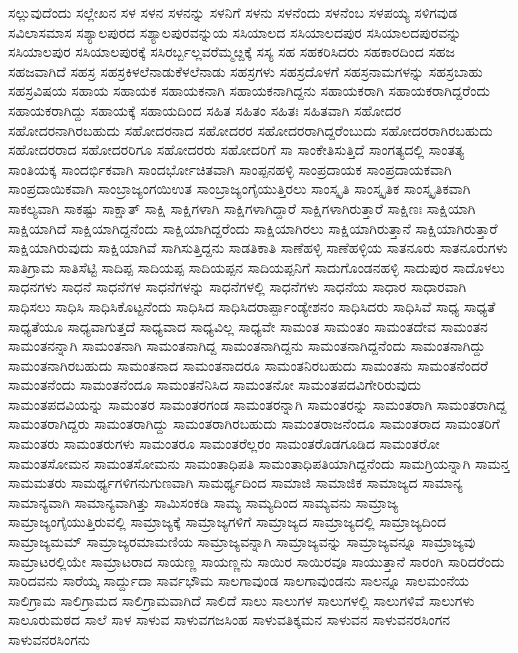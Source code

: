 {ಸಲ್ಲುವುದೆಂದು
ಸಲ್ಲೇಖನ
ಸಳ
ಸಳನ
ಸಳನನ್ನು
ಸಳನಿಗೆ
ಸಳನು
ಸಳನೆಂದು
ಸಳನೆಂಬ
ಸಳಪಯ್ಯ
ಸಳಿಗವುಡ
ಸವಿಲಾಸಮಾಸ
ಸಶ್ಯಾಲಪುರದ
ಸಶ್ಯಾಲಪುರವನ್ನುಯ
ಸಸಿಯಾಲದ
ಸಸಿಯಾಲದಪುರ
ಸಸಿಯಾಲದಪುರವನ್ನು
ಸಸಿಯಾಲಪುರ
ಸಸಿಯಾಲಪುರಕ್ಕೆ
ಸಸಿರರ್ಬ್ಬಲ್ಲವರೆಮ್ಮೞ್ದಕ್ಕೆ
ಸಸ್ಯ
ಸಹ
ಸಹಕರಿಸಿದರು
ಸಹಕಾರದಿಂದ
ಸಹಜ
ಸಹಜವಾಗಿದೆ
ಸಹಸ್ರ
ಸಹಸ್ರಕಿಳಲೆನಾಡುಕೆಳಲೆನಾಡು
ಸಹಸ್ರಗಳು
ಸಹಸ್ರದೊಳಗೆ
ಸಹಸ್ರನಾಮಗಳನ್ನು
ಸಹಸ್ರಬಾಹು
ಸಹಸ್ರವಿಷಯ
ಸಹಾಯ
ಸಹಾಯಕ
ಸಹಾಯಕನಾಗಿ
ಸಹಾಯಕನಾಗಿದ್ದನು
ಸಹಾಯಕರಾಗಿ
ಸಹಾಯಕರಾಗಿದ್ದರೆಂದು
ಸಹಾಯಕರಾಗಿದ್ದು
ಸಹಾಯಕ್ಕೆ
ಸಹಾಯದಿಂದ
ಸಹಿತ
ಸಹಿತಂ
ಸಹಿತಃ
ಸಹಿತವಾಗಿ
ಸಹೋದರ
ಸಹೋದರನಾಗಿರಬಹುದು
ಸಹೋದರನಾದ
ಸಹೋದರರ
ಸಹೋದರರಾಗಿದ್ದರೆಂಬುದು
ಸಹೋದರರಾಗಿರಬಹುದು
ಸಹೋದರರಾದ
ಸಹೋದರರಿಗೂ
ಸಹೋದರರು
ಸಹೋದರಿಗೆ
ಸಾ
ಸಾಂಕೇತಿಸುತ್ತಿದೆ
ಸಾಂಗತ್ಯದಲ್ಲಿ
ಸಾಂತತ್ಯ
ಸಾಂತಿಯಕ್ಕ
ಸಾಂದರ್ಭಿಕವಾಗಿ
ಸಾಂದರ್ಭೋಚಿತವಾಗಿ
ಸಾಂಪ್ಪನಹಳ್ಳಿ
ಸಾಂಪ್ರದಾಯಕ
ಸಾಂಪ್ರದಾಯಕವಾಗಿ
ಸಾಂಪ್ರದಾಯಿಕವಾಗಿ
ಸಾಂಬ್ರಾಜ್ಯಂಗಯಿಉತ
ಸಾಂಬ್ರಾಜ್ಯಂಗೈಯುತ್ತಿರಲು
ಸಾಂಸ್ಕೃತಿ
ಸಾಂಸ್ಕೃತಿಕ
ಸಾಂಸ್ಕೃತಿಕವಾಗಿ
ಸಾಕಲ್ಯವಾಗಿ
ಸಾಕಷ್ಟು
ಸಾಕ್ಷಾತ್
ಸಾಕ್ಷಿ
ಸಾಕ್ಷಿಗಳಾಗಿ
ಸಾಕ್ಷಿಗಳಾಗಿದ್ದಾರೆ
ಸಾಕ್ಷಿಗಳಾಗಿರುತ್ತಾರೆ
ಸಾಕ್ಷಿಣಃ
ಸಾಕ್ಷಿಯಾಗಿ
ಸಾಕ್ಷಿಯಾಗಿದೆ
ಸಾಕ್ಷಿಯಾಗಿದ್ದನೆಂದು
ಸಾಕ್ಷಿಯಾಗಿದ್ದರೆಂದು
ಸಾಕ್ಷಿಯಾಗಿರಲು
ಸಾಕ್ಷಿಯಾಗಿರುತ್ತಾನೆ
ಸಾಕ್ಷಿಯಾಗಿರುತ್ತಾರೆ
ಸಾಕ್ಷಿಯಾಗಿರುವುದು
ಸಾಕ್ಷಿಯಾಗಿವೆ
ಸಾಗಿಸುತ್ತಿದ್ದನು
ಸಾಡತಿಕಾತಿ
ಸಾಣೆಹಳ್ಳಿ
ಸಾಣೆಹಳ್ಳಿಯ
ಸಾತನೂರು
ಸಾತನೂರುಗಳು
ಸಾತಿಗ್ರಾಮ
ಸಾತಿಸೆಟ್ಟಿ
ಸಾದಿಪ್ಪ
ಸಾದಿಯಪ್ಪ
ಸಾದಿಯಪ್ಪನ
ಸಾದಿಯಪ್ಪನಿಗೆ
ಸಾದುಗೊಂಡನಹಳ್ಳಿ
ಸಾದುಪುರ
ಸಾದೊಳಲು
ಸಾಧನಗಳು
ಸಾಧನೆ
ಸಾಧನೆಗಳ
ಸಾಧನೆಗಳನ್ನು
ಸಾಧನೆಗಳಲ್ಲಿ
ಸಾಧನೆಗಳು
ಸಾಧನೆಯ
ಸಾಧಾರ
ಸಾಧಾರವಾಗಿ
ಸಾಧಿಸಲು
ಸಾಧಿಸಿ
ಸಾಧಿಸಿಕೊಟ್ಟನೆಂದು
ಸಾಧಿಸಿದ
ಸಾಧಿಸಿದರಾರ್ಪ್ಪಾಂಡ್ಯೇಶನಂ
ಸಾಧಿಸಿದರು
ಸಾಧಿಸಿವೆ
ಸಾಧ್ಯ
ಸಾಧ್ಯತೆ
ಸಾಧ್ಯತೆಯೂ
ಸಾಧ್ಯವಾಗುತ್ತದೆ
ಸಾಧ್ಯವಾದ
ಸಾಧ್ಯವಿಲ್ಲ
ಸಾಧ್ಯವೇ
ಸಾಮಂತ
ಸಾಮಂತಂ
ಸಾಮಂತದೇವ
ಸಾಮಂತನ
ಸಾಮಂತನನ್ನಾಗಿ
ಸಾಮಂತನಾಗಿ
ಸಾಮಂತನಾಗಿದ್ದ
ಸಾಮಂತನಾಗಿದ್ದನು
ಸಾಮಂತನಾಗಿದ್ದನೆಂದು
ಸಾಮಂತನಾಗಿದ್ದು
ಸಾಮಂತನಾಗಿರಬಹುದು
ಸಾಮಂತನಾದ
ಸಾಮಂತನಾದರೂ
ಸಾಮಂತನಿರಬಹುದು
ಸಾಮಂತನು
ಸಾಮಂತನೆಂದರೆ
ಸಾಮಂತನೆಂದು
ಸಾಮಂತನೆಂದೂ
ಸಾಮಂತನೆನಿಸಿದ
ಸಾಮಂತನೋ
ಸಾಮಂತಪದವಿಗೇರಿರುವುದು
ಸಾಮಂತಪದವಿಯನ್ನು
ಸಾಮಂತರ
ಸಾಮಂತರಗಂಡ
ಸಾಮಂತರನ್ನಾಗಿ
ಸಾಮಂತರನ್ನು
ಸಾಮಂತರಾಗಿ
ಸಾಮಂತರಾಗಿದ್ದ
ಸಾಮಂತರಾಗಿದ್ದರು
ಸಾಮಂತರಾಗಿದ್ದು
ಸಾಮಂತರಾಗಿರಬಹುದು
ಸಾಮಂತರಾಜನೆಂದೂ
ಸಾಮಂತರಾದ
ಸಾಮಂತರಿಗೆ
ಸಾಮಂತರು
ಸಾಮಂತರುಗಳು
ಸಾಮಂತರೂ
ಸಾಮಂತರೆಲ್ಲರಂ
ಸಾಮಂತರೊಡಗೂಡಿದ
ಸಾಮಂತರೋ
ಸಾಮಂತಸೋಮನ
ಸಾಮಂತಸೋಮನು
ಸಾಮಂತಾಧಿಪತಿ
ಸಾಮಂತಾಧಿಪತಿಯಾಗಿದ್ದನೆಂದು
ಸಾಮಗ್ರಿಯನ್ನಾಗಿ
ಸಾಮನ್ತ
ಸಾಮಮತರು
ಸಾಮರ್ಥ್ಯಗಳಿಗನುಗುಣವಾಗಿ
ಸಾಮರ್ಥ್ಯದಿಂದ
ಸಾಮಾಜಿ
ಸಾಮಾಜಿಕ
ಸಾಮಾಜ್ಯದ
ಸಾಮಾನ್ಯ
ಸಾಮಾನ್ಯವಾಗಿ
ಸಾಮಾನ್ಯವಾಗಿತ್ತು
ಸಾಮಿಸಂಕಡಿ
ಸಾಮ್ಯ
ಸಾಮ್ಯದಿಂದ
ಸಾಮ್ಯವನು
ಸಾಮ್ರಾಜ್ಯ
ಸಾಮ್ರಾಜ್ಯಂಗೈಯುತ್ತಿರುವಲ್ಲಿ
ಸಾಮ್ರಾಜ್ಯಕ್ಕೆ
ಸಾಮ್ರಾಜ್ಯಗಳಿಗೆ
ಸಾಮ್ರಾಜ್ಯದ
ಸಾಮ್ರಾಜ್ಯದಲ್ಲಿ
ಸಾಮ್ರಾಜ್ಯದಿಂದ
ಸಾಮ್ರಾಜ್ಯಮಮ್
ಸಾಮ್ರಾಜ್ಯರಮಾಮಣಿಯ
ಸಾಮ್ರಾಜ್ಯವನ್ನಾಗಿ
ಸಾಮ್ರಾಜ್ಯವನ್ನು
ಸಾಮ್ರಾಜ್ಯವನ್ನೂ
ಸಾಮ್ರಾಜ್ಯವು
ಸಾಮ್ರಾಟರಲ್ಲಿಯೇ
ಸಾಮ್ರಾಟರಾದ
ಸಾಯಣ್ಣ
ಸಾಯಣ್ಣನು
ಸಾಯಿರ
ಸಾಯಿರವೂ
ಸಾಯುತ್ತಾನೆ
ಸಾರಂಗಿ
ಸಾರಿದರೆಂದು
ಸಾರಿದವನು
ಸಾರೆಯ್ಕ
ಸಾರ್ದ್ದುದಾ
ಸಾರ್ವಭೌಮ
ಸಾಲಗಾವುಂಡ
ಸಾಲಗಾವುಂಡನು
ಸಾಲನ್ನೂ
ಸಾಲಮಂನೆಯ
ಸಾಲಿಗ್ರಾಮ
ಸಾಲಿಗ್ರಾಮದ
ಸಾಲಿಗ್ರಾಮವಾಗಿದೆ
ಸಾಲಿದೆ
ಸಾಲು
ಸಾಲುಗಳ
ಸಾಲುಗಳಲ್ಲಿ
ಸಾಲುಗಳಿವೆ
ಸಾಲುಗಳು
ಸಾಲೂರುಮಠದ
ಸಾಲೆ
ಸಾಳ
ಸಾಳುವ
ಸಾಳುವಗಜಸಿಂಹ
ಸಾಳುವತಿಕ್ಕಮನ
ಸಾಳುವನ
ಸಾಳುವನರಸಿಂಗನ
ಸಾಳುವನರಸಿಂಗನು
}
